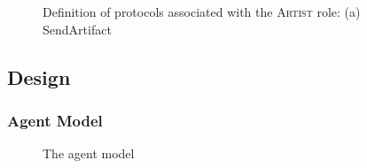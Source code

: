 \documentclass[paper=letter, fontsize=12pt]{article}
\begin{document}
\begin{figure}[H]
  \begin{center}
    \caption{Definition of protocols associated with the \textsc{Artist} role: \fontfamily{\sfdefault}\selectfont (a) SendArtifact}
    \label{fig:a_protocol}
  \end{center}
\end{figure}
\subsection{Design}
\subsubsection{Agent Model}
\begin{figure}[H]
  \begin{center}
    \caption{The agent model}
    \label{fig:agent_model}
  \end{center}
\end{figure}
\end{document}
